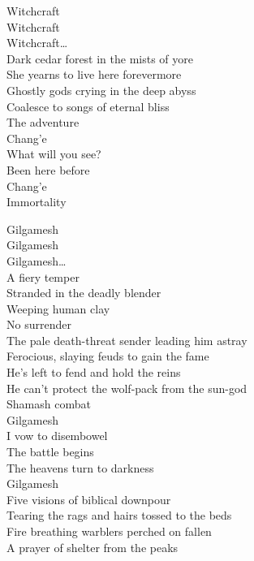 Witchcraft \\
Witchcraft \\
Witchcraft… \\

Dark cedar forest in the mists of yore \\
She yearns to live here forevermore \\
Ghostly gods crying in the deep abyss \\
Coalesce to songs of eternal bliss \\

The adventure \\
Chang'e \\
What will you see? \\
Been here before \\
Chang'e \\
Immortality \\



Gilgamesh \\
Gilgamesh \\
Gilgamesh… \\

A fiery temper \\
Stranded in the deadly blender \\
Weeping human clay \\
No surrender \\
The pale death-threat sender leading him astray \\
Ferocious, slaying feuds to gain the fame \\
He's left to fend and hold the reins \\
He can't protect the wolf-pack from the sun-god \\
Shamash combat \\

Gilgamesh \\
I vow to disembowel \\
The battle begins \\
The heavens turn to darkness \\
Gilgamesh \\

Five visions of biblical downpour \\
Tearing the rags and hairs tossed to the  beds \\
Fire breathing warblers perched on fallen \\
A prayer of shelter from the peaks \\

